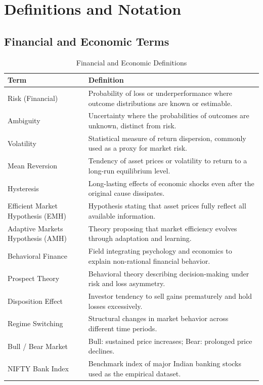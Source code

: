 \documentclass[conference]{IEEEtran}
\begin{document}
\section*{Definitions and Notation}
\subsection*{Financial and Economic Terms}
\begin{table}[htbp]
\centering
\caption{Financial and Economic Definitions}
\label{tab:fin_definitions}
\renewcommand{\arraystretch}{1.3}
\begin{tabular}{@{}p{3cm}p{5.2cm}@{}}
\toprule
\textbf{Term} & \textbf{Definition} \\
\midrule
Risk (Financial) & Probability of loss or underperformance where outcome distributions are known or estimable. \\
Ambiguity & Uncertainty where the probabilities of outcomes are unknown, distinct from risk. \\
Volatility & Statistical measure of return dispersion, commonly used as a proxy for market risk. \\
Mean Reversion & Tendency of asset prices or volatility to return to a long-run equilibrium level. \\
Hysteresis & Long-lasting effects of economic shocks even after the original cause dissipates. \\
Efficient Market Hypothesis (EMH) & Hypothesis stating that asset prices fully reflect all available information. \\
Adaptive Markets Hypothesis (AMH) & Theory proposing that market efficiency evolves through adaptation and learning. \\
Behavioral Finance & Field integrating psychology and economics to explain non-rational financial behavior. \\
Prospect Theory & Behavioral theory describing decision-making under risk and loss asymmetry. \\
Disposition Effect & Investor tendency to sell gains prematurely and hold losses excessively. \\
Regime Switching & Structural changes in market behavior across different time periods. \\
Bull / Bear Market & Bull: sustained price increases; Bear: prolonged price declines. \\
NIFTY Bank Index & Benchmark index of major Indian banking stocks used as the empirical dataset. \\
\bottomrule
\end{tabular}
\end{table}
\end{document}
